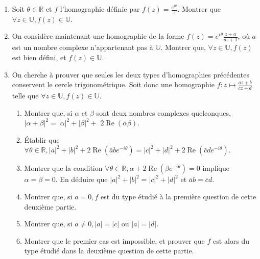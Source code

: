 \documentclass[a4paper, 11pt,reqno]{article}
\begin{document}
\begin{enumerate}
\item  Soit $\theta \in \mathbb{R}$ et $f$ l'homographie définie par $f(z)=\frac{e^{i \theta}}{z}$. Montrer que $\forall z \in \mathbb{U}, f(z) \in \mathbb{U}$.
\item  On considère maintenant une homographie de la forme $f(z)=e^{i \theta} \frac{z+a}{\bar{a} z+1}$, où $a$ est un nombre complexe n'appartenant pas à $\mathbb{U}$. Montrer que, $\forall z \in \mathbb{U}, f(z)$ est bien défini, et $f(z) \in \mathbb{U}$.
\item On cherche à prouver que seules les deux types d'homographies précédentes conservent le cercle trigonométrique. Soit donc une homographie $f: z \mapsto \frac{a z+b}{c z+d}$ telle que $\forall z \in \mathbb{U}, f(z) \in \mathbb{U}$.
\begin{enumerate}
\item Montrer que, si $\alpha$ et $\beta$ sont deux nombres complexes quelconques, $|\alpha+\beta|^{2}=|\alpha|^{2}+|\beta|^{2}+$ $2 \operatorname{Re}(\bar{\alpha} \beta)$.
\item  Établir que $\forall \theta \in \mathbb{R},|a|^{2}+|b|^{2}+2 \operatorname{Re}\left(\bar{a} b e^{-i \theta}\right)=|c|^{2}+|d|^{2}+2 \operatorname{Re}\left(\bar{c} d e^{-i \theta}\right)$.
\item  Montrer que la condition $\forall \theta \in \mathbb{R}, \alpha+2 \operatorname{Re}\left(\beta e^{-i \theta}\right)=0$ implique $\alpha=\beta=0$. En déduire que $|a|^{2}+|b|^{2}=|c|^{2}+|d|^{2}$ et $\bar{a} b=\bar{c} d$.
\item  Montrer que, si $a=0, f$ est du type étudié à la première question de cette deuxième partie.
\item  Montrer que, si $a \neq 0,|a|=|c|$ ou $|a|=|d|$.
\item  Montrer que le premier cas est impossible, et prouver que $f$ est alors du type étudié dans la deuxième question de cette partie.
\end{enumerate}

\end{enumerate}

\end{document}
